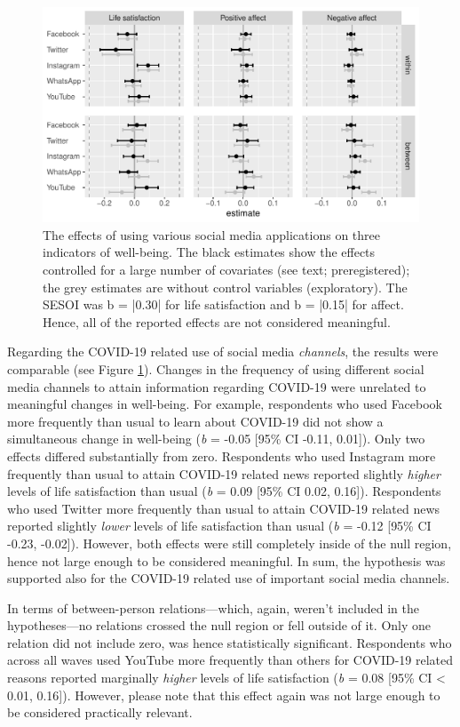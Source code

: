\documentclass[
  english,
  man,mask,floatsintext]{apa6}
\begin{document}
\begin{figure}
\includegraphics[width=\textwidth]{figures/fig_results_channel} \caption{The effects of using various social media applications on three indicators of well-being. The black estimates show the effects controlled for a large number of covariates (see text; preregistered); the grey estimates are without control variables (exploratory). The SESOI was b = |0.30| for life satisfaction and b = |0.15| for affect. Hence, all of the reported effects are not considered meaningful.}\label{fig:res-channels}
\end{figure}

Regarding the COVID-19 related use of social media \emph{channels}, the results were comparable (see Figure \ref{fig:res-channels}).
Changes in the frequency of using different social media channels to attain information regarding COVID-19 were unrelated to meaningful changes in well-being.
For example, respondents who used Facebook more frequently than usual to learn about COVID-19 did not show a simultaneous change in well-being (\emph{b} = -0.05 {[}95\% CI -0.11, 0.01{]}).
Only two effects differed substantially from zero.
Respondents who used Instagram more frequently than usual to attain COVID-19 related news reported slightly \emph{higher} levels of life satisfaction than usual (\emph{b} = 0.09 {[}95\% CI 0.02, 0.16{]}).
Respondents who used Twitter more frequently than usual to attain COVID-19 related news reported slightly \emph{lower} levels of life satisfaction than usual (\emph{b} = -0.12 {[}95\% CI -0.23, -0.02{]}).
However, both effects were still completely inside of the null region, hence not large enough to be considered meaningful.
In sum, the hypothesis was supported also for the COVID-19 related use of important social media channels.

In terms of between-person relations---which, again, weren't included in the hypotheses---no relations crossed the null region or fell outside of it.
Only one relation did not include zero, was hence statistically significant.
Respondents who across all waves used YouTube more frequently than others for COVID-19 related reasons reported marginally \emph{higher} levels of life satisfaction (\emph{b} = 0.08 {[}95\% CI \textless{} 0.01, 0.16{]}).
However, please note that this effect again was not large enough to be considered practically relevant.
\end{document}
